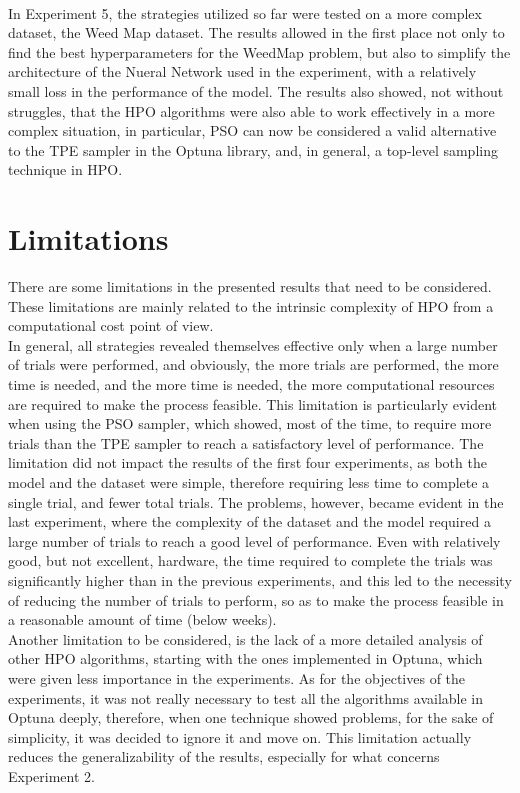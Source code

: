 \\[0.3cm]In Experiment 5, the strategies utilized so far were tested on a more complex dataset, the Weed Map dataset. The results allowed in the first place not only to find the best hyperparameters for the WeedMap problem, but also to simplify the architecture of the Nueral Network used in the experiment, with a relatively small loss in the performance of the model. The results also showed, not without struggles, that the HPO algorithms were also able to work effectively in a more complex situation, in particular, PSO can now be considered a valid alternative to the TPE sampler in the Optuna library, and, in general, a top-level sampling technique in HPO. 

\section{Limitations}

There are some limitations in the presented results that need to be considered. These limitations are mainly related to the intrinsic complexity of HPO from a computational cost point of view.
\\[0.3cm]In general, all strategies revealed themselves effective only when a large number of trials were performed, and obviously, the more trials are performed, the more time is needed, and the more time is needed, the more computational resources are required to make the process feasible. This limitation is particularly evident when using the PSO sampler, which showed, most of the time, to require more trials than the TPE sampler to reach a satisfactory level of performance.
The limitation did not impact the results of the first four experiments, as both the model and the dataset were simple, therefore requiring less time to complete a single trial, and fewer total trials. The problems, however, became evident in the last experiment, where the complexity of the dataset and the model required a large number of trials to reach a good level of performance. Even with relatively good, but not excellent, hardware, the time required to complete the trials was significantly higher than in the previous experiments, and this led to the necessity of reducing the number of trials to perform, so as to make the process feasible in a reasonable amount of time (below weeks).
\\[0.3cm]Another limitation to be considered, is the lack of a more detailed analysis of other HPO algorithms, starting with the ones implemented in Optuna, which were given less importance in the experiments. As for the objectives of the experiments, it was not really necessary to test all the algorithms available in Optuna deeply, therefore, when one technique showed problems, for the sake of simplicity, it was decided to ignore it and move on. This limitation actually reduces the generalizability of the results, especially for what concerns Experiment 2.

